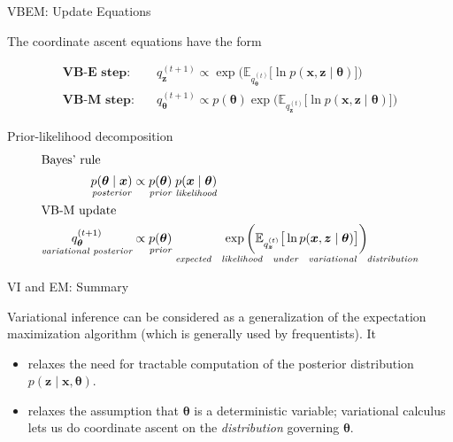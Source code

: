 \documentclass[10pt]{beamer}
\newcommand{\+}[1]{\ensuremath{{\boldsymbol #1}}} %
\newcommand{\cond}{\; | \;}
\newcommand{\E}{\mathbb{E}}
\newcommand{\explainterm}[2]{\underset{\textit{#1}}{#2}}
\begin{document}
\begin{frame}{VBEM: Update Equations}

The coordinate ascent equations have the form

\begin{align}
\textbf{VB-E step}: \quad & q_{\+z}^{(t+1)} \propto \exp \bigg( \E_{q_\+\theta^{(t)}} \big[\ln p(\+x, \+z \cond \+\theta) \big] \bigg)  \label{vbe_update} \\
\textbf{VB-M step}: \quad & q_{\+\theta}^{(t+1)} \propto p(\+\theta) \exp \bigg( \E_{q_\+z^{(t)}} \big[\ln p(\+x, \+z \cond \+\theta) \big] \bigg) \label{vbm_update}
\end{align} 


 
\begin{block}{Prior-likelihood decomposition}
\begin{align*}
\intertext{Bayes' rule}
\explainterm{posterior}{p(\+\theta \cond \+x)} & \propto \explainterm{prior}{p(\+\theta)}  \;  \explainterm{likelihood}{p(\+x \cond \+ \theta)} \\
\intertext{VB-M update}
\explainterm{variational posterior}{q_{\+\theta}^{(t+1)}} & \propto \explainterm{prior}{p(\+\theta)} \;  \explainterm{expected \; likelihood \; under \; variational \; distribution}{ \exp  \bigg( \E_{q_\+z^{(t)}} \big[ \ln p(\+x, \+z \cond \+\theta) \big] \bigg)} \\
\end{align*}
\end{block}

\end{frame}






\begin{frame}{VI and EM: Summary}

Variational inference can be considered as a generalization of the expectation maximization algorithm (which is generally used by frequentists).  It

\begin{itemize}
\item relaxes the need for tractable computation of the posterior distribution $p(\+z \cond \+x, \+\theta)$. 
\item relaxes the assumption that $\+\theta$ is a deterministic variable; variational calculus lets us do coordinate ascent on the \textit{distribution} governing $\+\theta$. 
\end{itemize}
\end{frame}
\end{document}

